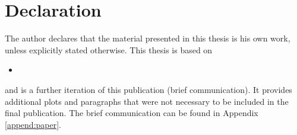 \chapter*{Declaration}
\label{chap:declaration}

The author declares that the material presented in this thesis is his own work, unless explicitly stated otherwise. This thesis is based on
\bigskip
\begin{itemize}
    \item [] 
\end{itemize}
\bigskip
and is a further iteration of this publication (brief communication). It provides additional plots and paragraphs that were not necessary to be included in the final publication. The brief communication can be found in Appendix \ref{append:paper}.
